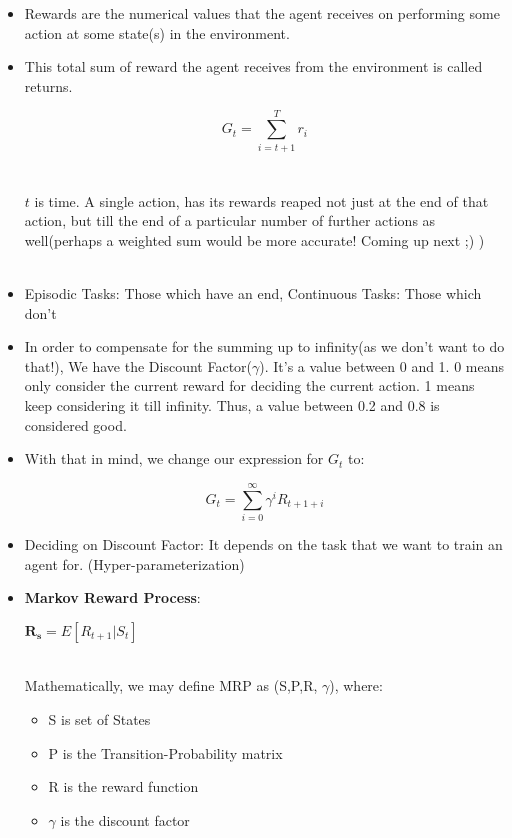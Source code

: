 \documentclass{article}
\begin{document}
\begin{itemize}
  \item  Rewards are the numerical values that the agent receives on performing some action at some state(s) in the environment.
  \item This total sum of reward the agent receives from the environment is called returns. \\
  \begin{center}
    \[ G_{t} = \sum_{i = t+1}^{T}{r_{i}} \] \\~\\
    $t$ is time. A single action, has its rewards reaped not just at the end of that action, but till the end of a particular number of further actions as well(perhaps a weighted sum would be more accurate! Coming up next ;) ) \\~\\
  \end{center}

  \item Episodic Tasks: Those which have an end, Continuous Tasks: Those which don't
  \item In order to compensate for the summing up to infinity(as we don't want to do that!), We have the Discount Factor($\gamma$). It's a value between 0 and 1. 0 means only consider the current reward for deciding the current action. 1 means keep considering it till infinity. Thus, a value between 0.2 and 0.8 is considered good.
  \item With that in mind, we change our expression for $G_t$ to:
  \begin{center}
     \[ G_{t} =  \sum_{i = 0}^{ \infty }{ \gamma^{i} R_{t+1+i}} \]
  \end{center}

  \item Deciding on Discount Factor: It depends on the task that we want to train an agent for. (Hyper-parameterization)

  \item \textbf{Markov Reward Process}:
  \begin{center}
    $\mathbf{R_s} = E[R_{t+1} | S_{t} ]$    \\~\\
  \end{center}
  Mathematically, we may define MRP as (S,P,R, $\gamma$), where: \\
  \begin{itemize}
    \item S is set of States
    \item P is the Transition-Probability matrix
    \item R is the reward function
    \item $\gamma$ is the discount factor
  \end{itemize}


\end{itemize}
\end{document}
